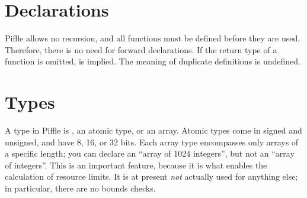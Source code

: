 \documentclass[a4paper,12pt]{scrreprt}
\begin{document}

\section{Declarations}

Piffle allows no recursion, and all functions must be defined before
they are used. Therefore, there is no need for forward
declarations. If the return type of a function is omitted, 
is implied. The meaning of duplicate definitions is undefined.


\section{Types}

A type in Piffle is , an atomic type, or an array. Atomic
types come in signed and unsigned, and have 8, 16, or 32 bits.  Each
array type encompasses only arrays of a specific length; you can
declare an ``array of 1024 integers'', but not an ``array of
integers''. This is an important feature, because it is what enables
the calculation of resource limits. It is at present \textit{not}
actually used for anything else; in particular, there are no bounds
checks.

\end{document}

